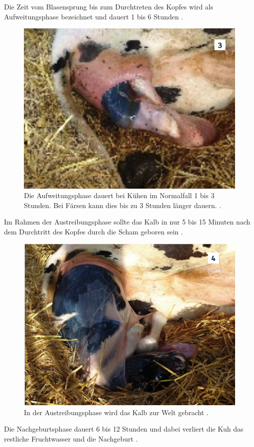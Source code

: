 Die Zeit vom Blasensprung bis zum Durchtreten des Kopfes wird als Aufweitungsphase bezeichnet und dauert 1 bis 6 Stunden \citep[S. 7 ]{Traulsen2013}. 
\begin{figure}[H]
	\center
	\includegraphics[scale=.45]{Grafiken/aufweitungsphase.png}
	\caption{ Die Aufweitungsphase dauert bei Kühen im Normalfall 1 bis 3 Stunden. Bei Färsen kann dies bis zu 3 Stunden länger dauern. \citep[S. 7 ]{Traulsen2013}.}
	\label{fig: Öffnungsphase}
\end{figure} 

Im Rahmen der Austreibungsphase sollte das Kalb in nur 5 bis 15 Minuten nach dem Durchtritt des Kopfes durch die Scham geboren sein \citep[S. 8 ]{Traulsen2013}.  


\begin{figure}[H]
	\center
	\includegraphics[scale=.45]{Grafiken/austreibungsphase.png}
	\caption{ In der Austreibungsphase wird das Kalb zur Welt gebracht \citep[S. 8 ]{Traulsen2013}.}
	\label{fig: Öffnungsphase}
\end{figure}


Die Nachgeburtsphase dauert 6 bis 12 Stunden und dabei verliert die Kuh das restliche Fruchtwasser und die Nachgeburt \citep[S. 8 ]{Traulsen2013}.  
